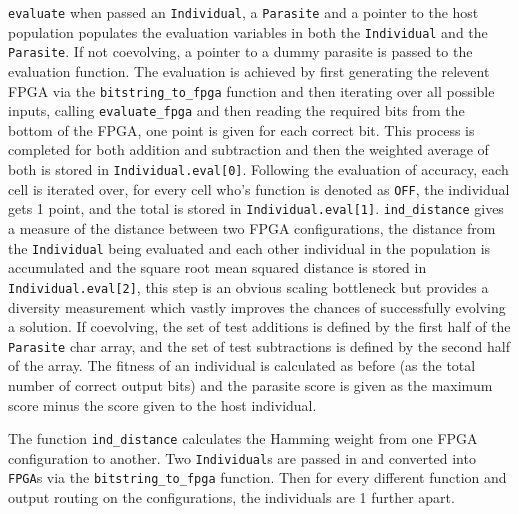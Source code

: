 \texttt{evaluate} when passed an \texttt{Individual}, a \texttt{Parasite}
and a pointer to the host population populates the evaluation variables in both
the \texttt{Individual} and the \texttt{Parasite}. If not coevolving, a pointer
to a dummy parasite is passed to the evaluation function. The evaluation is achieved
by first generating the relevent FPGA via the \texttt{bitstring\_to\_fpga} function
and then iterating over all possible inputs, calling \texttt{evaluate\_fpga} and
then reading the required bits from the bottom of the FPGA, one point is given
for each correct bit. This process is completed for both addition and subtraction
and then the weighted average of both is stored in \texttt{Individual.eval[0]}.
Following the evaluation of accuracy, each cell is iterated over, for every
cell who's function is denoted as \texttt{OFF}, the individual gets 1 point,
and the total is stored in \texttt{Individual.eval[1]}. \texttt{ind\_distance}
gives a measure of the distance between two FPGA configurations, the distance
from the \texttt{Individual} being evaluated and each other individual in the
population is accumulated and the square root mean squared distance is stored
in \texttt{Individual.eval[2]}, this step is an obvious scaling bottleneck but
provides a diversity measurement which vastly improves the chances of successfully
evolving a solution. If coevolving, the set of test additions is defined by the
first half of the \texttt{Parasite} char array, and the set of test subtractions
is defined by the second half of the array. The fitness of an individual is calculated
as before (as the total number of correct output bits) and the parasite score is
given as the maximum score minus
the score given to the host individual.

The function \texttt{ind\_distance}
calculates the Hamming weight from one FPGA configuration to another. Two
\texttt{Individual}s are passed in and converted into \texttt{FPGA}s via the \texttt{bitstring\_to\_fpga}
function. Then for every
different function and output routing on the configurations, the individuals are 1 further apart.


